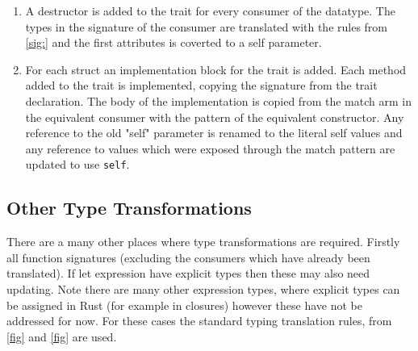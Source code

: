 \documentclass[ oneside,%
                    author={James Elgar},
                    degree={MEng},
                     title={Bidirectional transformer between functional and \\ object-oriented programming in Rust},
                  subtitle={}]{dissertation}
\begin{document}
\begin{enumerate}
    \item A destructor is added to the trait for every consumer of the datatype. The types in the signature of the consumer are translated with the rules from \autoref{sig:} and the first attributes is coverted to a self parameter. %
    \item For each struct an implementation block for the trait is added. Each method added to the trait is implemented, copying the signature from the trait declaration. The body of the implementation is copied from the match arm in the equivalent consumer with the pattern of the equivalent constructor. Any reference to the old "self" parameter is renamed to the literal self values and any reference to values which were exposed through the match pattern are updated to use \verb|self|.
\end{enumerate}



\subsection{Other Type Transformations}

There are a many other places where type transformations are required. Firstly all function signatures (excluding the consumers which have already been translated). If let expression have explicit types then these may also need updating. Note there are many other expression types, where explicit types can be assigned in Rust (for example in closures) however these have not be addressed for now.
For these cases the standard typing translation rules, from \autoref{fig} and \autoref{fig} are used.




\end{document}
